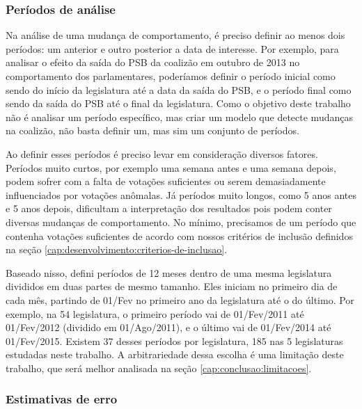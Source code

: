 \documentclass[a4paper,titlepage]{ppgi}\usepackage[]{graphicx}\usepackage[]{color}
\begin{document}
\subsubsection{Períodos de análise}
\label{cap:desenvolvimento:periodos-de-analise}

Na análise de uma mudança de comportamento, é preciso definir ao menos dois
períodos: um anterior e outro posterior a data de interesse. Por exemplo, para
analisar o efeito da saída do PSB da coalizão em outubro de 2013 no
comportamento dos parlamentares, poderíamos definir o período inicial como
sendo do início da legislatura até a data da saída do PSB, e o período final
como sendo da saída do PSB até o final da legislatura. Como o objetivo deste
trabalho não é analisar um período específico, mas criar um modelo que detecte
mudanças na coalizão, não basta definir um, mas sim um conjunto de
períodos.

Ao definir esses períodos é preciso levar em consideração diversos fatores.
Períodos muito curtos, por exemplo uma semana antes e uma semana depois, podem
sofrer com a falta de votações suficientes ou serem demasiadamente
influenciados por votações anômalas. Já períodos muito longos, como 5 anos
antes e 5 anos depois, dificultam a interpretação dos resultados pois podem
conter diversas mudanças de comportamento. No mínimo, precisamos de um período
que contenha votações suficientes de acordo com nossos critérios de inclusão
definidos na seção \ref{cap:desenvolvimento:criterios-de-inclusao}.

Baseado nisso, defini períodos de 12 meses dentro de uma mesma legislatura
divididos em duas partes de mesmo tamanho. Eles iniciam no primeiro dia de cada
mês, partindo de 01/Fev no primeiro ano da legislatura até o do último. Por
exemplo, na 54\textordfeminine{} legislatura, o primeiro período vai de
01/Fev/2011 até 01/Fev/2012 (dividido em 01/Ago/2011), e o último vai de
01/Fev/2014 até 01/Fev/2015. Existem 37 desses períodos por legislatura, 185
nas 5 legislaturas estudadas neste trabalho. A arbitrariedade dessa escolha é
uma limitação deste trabalho, que será melhor analisada na seção
\ref{cap:conclusao:limitacoes}.

\subsubsection{Estimativas de erro}
\label{cap:miolo:estimativas-de-erro}
\end{document}
